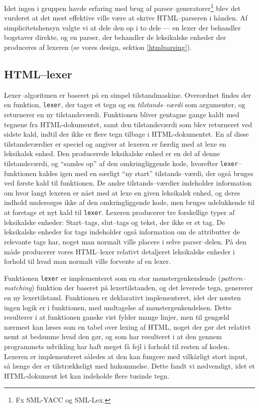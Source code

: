 \documentclass[a4paper,oneside]{memoir}
\begin{document}
Idet ingen i gruppen havde erfaring med brug af
parser--generatorer\footnote{Fx SML-YACC og SML-Lex.}
blev det vurderet at det mest effektive ville være at skrive
HTML--parseren i hånden. Af simplicitetshensyn valgte vi at dele den
op i to dele --- en lexer der behandler bogstaver direkte, og en
parser, der behandler de leksikalske enheder der produceres af lexeren
(se vores design, sektion \ref{htmlparsing}).

\subsection{HTML--lexer}
\label{htmllexerimpl}
Lexer--algoritmen er baseret på en simpel tilstandmaskine. Overordnet
findes der en funktion, \texttt{lexer}, der tager et tegn og en
\textit{tilstands--værdi} som argumenter, og returnerer en ny
tilstandsværdi. Funktionen bliver gentagne gange kaldt med tegnene fra
HTML-dokumentet, samt den tilstandsværdi som blev returneret ved
sidste kald, indtil der ikke er flere tegn tilbage i
HTML-dokumentet. En af disse tilstandsværdier er speciel og angiver at
lexeren er færdig med at lexe en leksikalsk enhed. Den producerede
leksikalske enhed er en del af denne tilstandsværdi, og ``samles op''
af den omkringliggende kode, hvorefter \texttt{lexer}--funktionen
kaldes igen med en særligt ``ny start'' tilstands--værdi, der også
bruges ved første kald til funktionen. De andre tilstands--værdier
indeholder information om hvor langt lexeren er nået med at lexe en
given leksikalsk enhed, og deres indhold undersøges ikke af den
omkringliggende kode, men bruges udelukkende til at foretage et nyt
kald til \texttt{lexer}. Lexeren producerer tre forskellige typer af
leksikalske enheder: Start--tags, slut--tags og tekst, der ikke er et
tag. De leksikalske enheder for tags indeholder også information om de
attributter de relevante tags har, noget man normalt ville placere i
selve parser--delen. På den måde producerer vores HTML--lexer relativt
detaljeret leksikalske enheder i forhold til hvad man normalt ville
forvente af en lexer.

Funktionen \texttt{lexer} er implementeret som en stor
mønstergenkendende (\textit{pattern--matching}) funktion der baseret
på lexertilstanden, og det leverede tegn, genererer en ny
lexertilstand. Funktionen er deklarativt implementeret, idet der
næsten ingen logik er i funktionen, med undtagelse af
mønstergenkendelsen. Dette resulterer i at funktionen ganske vist
fylder mange linjer, men til gengæld nærmest kan læses som en tabel
over lexing af HTML, noget der gør det relativt nemt at bedømme hvad
den gør, og som har resulteret i at den gennem programmets udvikling
har haft meget få fejl i forhold til resten af koden. Lexeren er
implementeret således at den kan fungere med vilkårligt stort input,
så længe der er tilstrækkeligt med hukommelse. Dette fandt vi
nødvendigt, idet et HTML-dokument let kan indeholde flere tusinde
tegn.
\end{document}
